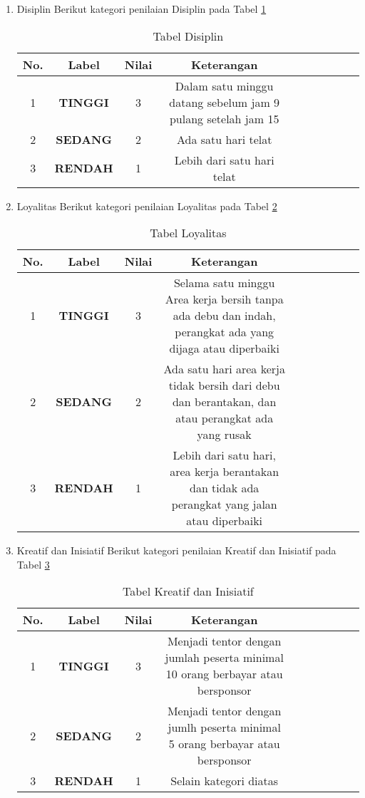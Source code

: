 \begin{enumerate}
\item Disiplin
Berikut kategori penilaian Disiplin pada Tabel \ref{table:Disiplin}
\begin{table}[!htbp]
\centering
\begin{tabular}{ |c|c|c|c|c|c|c|c|c|c| }
\hline
No. & Label & Nilai & Keterangan \\
\hline
1 & \textbf{TINGGI} & 3 & Dalam satu minggu datang sebelum jam 9 pulang setelah jam 15 \\
\hline
2 & \textbf{SEDANG} & 2 & Ada satu hari telat \\
\hline
3 & \textbf{RENDAH} & 1 & Lebih dari satu hari telat \\
\hline
\end{tabular}
\caption{Tabel Disiplin}
\label{table:Disiplin}
\end{table}

\item Loyalitas
Berikut kategori penilaian Loyalitas pada Tabel \ref{table:Loyalitas}
\begin{table}[!htbp]
\centering
\begin{tabular}{ |c|c|c|c|c|c|c|c|c|c| }
\hline
No. & Label & Nilai & Keterangan \\
\hline
1 & \textbf{TINGGI} & 3 & Selama satu minggu Area kerja bersih tanpa ada debu dan indah, perangkat ada yang dijaga atau diperbaiki \\
\hline
2 & \textbf{SEDANG} & 2 & Ada satu hari area kerja tidak bersih dari debu dan berantakan, dan atau perangkat ada yang rusak \\
\hline
3 & \textbf{RENDAH} & 1 & Lebih dari satu hari, area kerja berantakan dan tidak ada perangkat yang jalan atau diperbaiki \\
\hline
\end{tabular}
\caption{Tabel Loyalitas}
\label{table:Loyalitas}
\end{table}

\item Kreatif dan Inisiatif
Berikut kategori penilaian Kreatif dan Inisiatif pada Tabel \ref{table:KnI}
\begin{table}[!htbp]
\centering
\begin{tabular}{ |c|c|c|c|c|c|c|c|c|c| }
\hline
No. & Label & Nilai & Keterangan \\
\hline
1 & \textbf{TINGGI} & 3 & Menjadi tentor dengan jumlah peserta minimal 10 orang berbayar atau bersponsor \\
\hline
2 & \textbf{SEDANG} & 2 & Menjadi tentor dengan jumlh peserta minimal 5 orang berbayar atau bersponsor \\
\hline
3 & \textbf{RENDAH} & 1 & Selain kategori diatas \\
\hline
\end{tabular}
\caption{Tabel Kreatif dan Inisiatif}
\label{table:KnI}
\end{table}
\end{enumerate}
